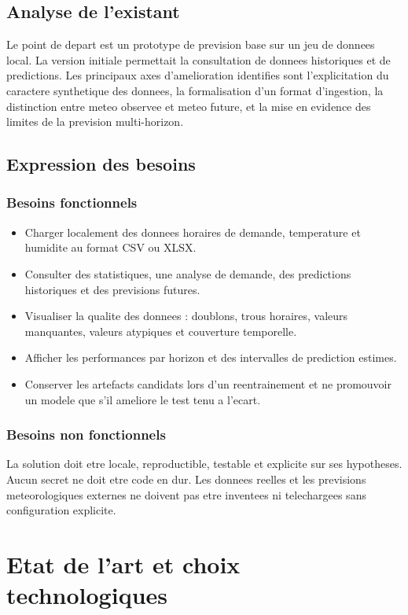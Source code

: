 \documentclass[12pt,a4paper,oneside]{report}
\begin{document}
\section{Analyse de l'existant}
Le point de depart est un prototype de prevision base sur un jeu de donnees local. La version initiale permettait la consultation de donnees historiques et de predictions. Les principaux axes d'amelioration identifies sont l'explicitation du caractere synthetique des donnees, la formalisation d'un format d'ingestion, la distinction entre meteo observee et meteo future, et la mise en evidence des limites de la prevision multi-horizon.

\section{Expression des besoins}
\subsection{Besoins fonctionnels}
\begin{itemize}[leftmargin=*]
\item Charger localement des donnees horaires de demande, temperature et humidite au format CSV ou XLSX.
\item Consulter des statistiques, une analyse de demande, des predictions historiques et des previsions futures.
\item Visualiser la qualite des donnees : doublons, trous horaires, valeurs manquantes, valeurs atypiques et couverture temporelle.
\item Afficher les performances par horizon et des intervalles de prediction estimes.
\item Conserver les artefacts candidats lors d'un reentrainement et ne promouvoir un modele que s'il ameliore le test tenu a l'ecart.
\end{itemize}
\subsection{Besoins non fonctionnels}
La solution doit etre locale, reproductible, testable et explicite sur ses hypotheses. Aucun secret ne doit etre code en dur. Les donnees reelles et les previsions meteorologiques externes ne doivent pas etre inventees ni telechargees sans configuration explicite.

\chapter{Etat de l'art et choix technologiques}
\end{document}
